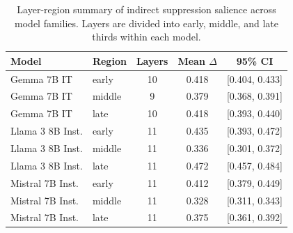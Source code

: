 \begin{table}[t]
\centering
\small
\begin{tabular}{l l c c c}
\toprule
Model & Region & Layers & Mean $\Delta$ & 95\% CI \\
\midrule
Gemma 7B IT & early & 10 & 0.418 & [0.404, 0.433] \\
Gemma 7B IT & middle & 9 & 0.379 & [0.368, 0.391] \\
Gemma 7B IT & late & 10 & 0.418 & [0.393, 0.440] \\
Llama 3 8B Inst. & early & 11 & 0.435 & [0.393, 0.472] \\
Llama 3 8B Inst. & middle & 11 & 0.336 & [0.301, 0.372] \\
Llama 3 8B Inst. & late & 11 & 0.472 & [0.457, 0.484] \\
Mistral 7B Inst. & early & 11 & 0.412 & [0.379, 0.449] \\
Mistral 7B Inst. & middle & 11 & 0.328 & [0.311, 0.343] \\
Mistral 7B Inst. & late & 11 & 0.375 & [0.361, 0.392] \\
\bottomrule
\end{tabular}
\caption{Layer-region summary of indirect suppression salience across model families. Layers are divided into early, middle, and late thirds within each model.}
\label{tab:layer-region-suppression}
\end{table}
